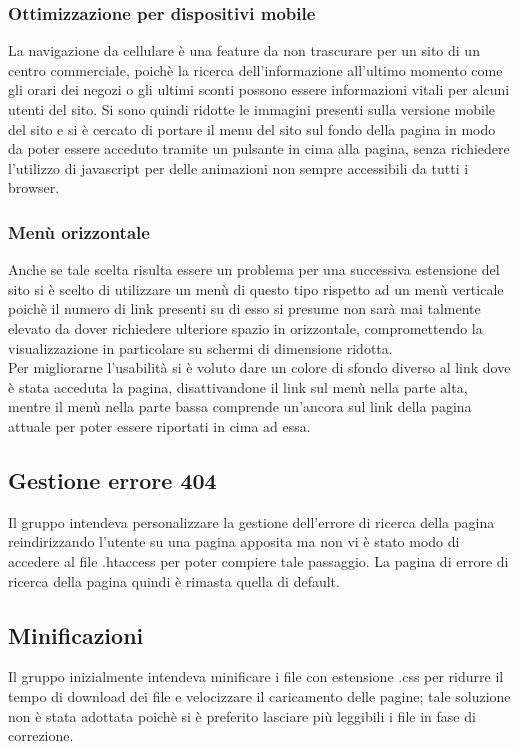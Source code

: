\documentclass[a4paper,12pt]{article}
\begin{document}
\subsubsection{Ottimizzazione per dispositivi mobile}
La navigazione da cellulare è una feature da non trascurare per un sito di un centro commerciale, poichè la ricerca dell'informazione all'ultimo momento come gli orari dei negozi o gli ultimi sconti possono essere informazioni vitali per alcuni utenti del sito. Si sono quindi ridotte le immagini presenti sulla versione mobile del sito e si è cercato di portare il menu del sito sul fondo della pagina in modo da poter essere acceduto tramite un pulsante in cima alla pagina, senza richiedere l'utilizzo di javascript per delle animazioni non sempre accessibili da tutti i browser.
\subsubsection{Menù orizzontale}
Anche se tale scelta risulta essere un problema per una successiva estensione del sito si è scelto di utilizzare un menù di questo tipo rispetto ad un menù verticale poichè il numero di link presenti su di esso si presume non sarà mai talmente elevato da dover richiedere ulteriore spazio in orizzontale, compromettendo la visualizzazione in particolare su schermi di dimensione ridotta.\\
Per migliorarne l'usabilità si è voluto dare un colore di sfondo diverso al link dove è stata acceduta la pagina, disattivandone il link sul menù nella parte alta, mentre il menù nella parte bassa comprende un'ancora sul link della pagina attuale per poter essere riportati in cima ad essa.
\subsection{Gestione errore 404}
Il gruppo intendeva personalizzare la gestione dell'errore di ricerca della pagina reindirizzando l'utente su una pagina apposita ma non vi è stato modo di accedere al file .htaccess per poter compiere tale passaggio. La pagina di errore di ricerca della pagina quindi è rimasta quella di default.
\subsection{Minificazioni}
Il gruppo inizialmente intendeva minificare i file con estensione .css per ridurre il tempo di download dei file e velocizzare il caricamento delle pagine; tale soluzione non è stata adottata poichè si è preferito lasciare più leggibili i file in fase di correzione.
\end{document}
